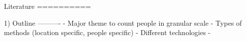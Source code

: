 Literature
==========

1) Outline
----------
 - Major theme to count people in granular scale
 - Types of methods (location specific, people specific)
 - Different technologies
 - 
